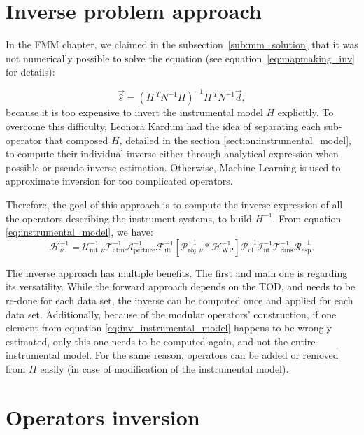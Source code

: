 \documentclass[../../thesis.tex]{subfiles}
\begin{document}
\section{Inverse problem approach}

In the FMM chapter, we claimed in the subsection~\ref{sub:mm_solution} that it was not numerically possible to solve the equation (see equation~\ref{eq:mapmaking_inv} for details):

\begin{equation}
    \vec{\hat{s}} = (H^{~T} N^{-1} H)^{-1} H^{~T} N^{-1} \vec{d},
\end{equation}
because it is too expensive to invert the instrumental model $H$ explicitly. To overcome this difficulty, Leonora Kardum had the idea of separating each sub-operator that composed $H$, detailed in the section \ref{section:instrumental_model}, to compute their individual inverse either through analytical expression when possible or pseudo-inverse estimation. Otherwise, Machine Learning is used to approximate inversion for too complicated operators.

Therefore, the goal of this approach is to compute the inverse expression of all the operators describing the instrument systems, to build $H^{-1}$. From equation \ref{eq:instrumental_model}, we have:
\begin{equation}
    \mathcal{H}_{\nu}^{-1} = \mathcal{U}_{\text{nit}, \nu}^{-1} \mathcal{T}_{\text{atm}}^{-1} \mathcal{A}_{\text{perture}}^{-1} \mathcal{F}_{\text{ilt}}^{-1} [\mathcal{P}_{\text{roj}, \nu}^{-1} * \mathcal{H}_{\text{WP}}^{-1}] \mathcal{P}_{\text{ol}}^{-1} \mathcal{I}_{\text{nt}}^{-1} \mathcal{T}_{\text{rans}}^{-1} \mathcal{R}_{\text{esp}}^{-1}.
    \label{eq:inv_instrumental_model}
\end{equation}

The inverse approach has multiple benefits. The first and main one is regarding its versatility. While the forward approach depends on the TOD, and needs to be re-done for each data set, the inverse can be computed once and applied for each data set. Additionally, because of the modular operators' construction, if one element from equation \ref{eq:inv_instrumental_model} happens to be wrongly estimated, only this one needs to be computed again, and not the entire instrumental model. For the same reason, operators can be added or removed from $H$ easily (in case of modification of the instrumental model). 

\section{Operators inversion}
\end{document}
